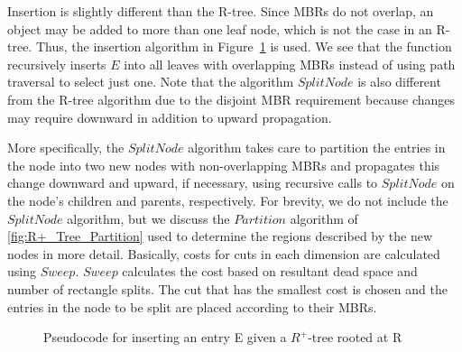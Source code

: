 Insertion is slightly different than the R-tree. Since MBRs do not overlap, an
object may be added to more than one leaf node, which is not the case in an R-tree. 
Thus, the insertion algorithm in Figure~\ref{fig:R+_Tree_Insert} is used. We see that
the function recursively inserts $E$ into all leaves with overlapping MBRs instead of 
using path traversal to select just one. Note that the algorithm $SplitNode$ is 
also different from the R-tree algorithm due to the disjoint MBR requirement because
changes may require downward in addition to upward propagation. 

More specifically, the $SplitNode$ algorithm takes care to partition the entries in 
the node into two new nodes with non-overlapping MBRs and propagates this change 
downward and upward, if necessary, using recursive calls to $SplitNode$ on the node's
children and parents, respectively. For brevity, we do not include the $SplitNode$ 
algorithm, but we discuss the $Partition$ algorithm of \ref{fig:R+_Tree_Partition} 
used to determine the regions described by the new nodes in more detail. Basically, 
costs for cuts in each dimension are calculated using $Sweep$. $Sweep$ calculates the
cost based on resultant dead space and number of rectangle splits. The cut that has 
the smallest cost is chosen and the entries in the node to be split are placed 
according to their MBRs. 

\begin{figure}
\begin{algorithmic}
					\State {}
				\EndIf
			\EndFor
		\Else
				\State {}
			\Else
			\EndIf
		\EndIf
	\EndFunction
\end{algorithmic}
\caption{Pseudocode for inserting an entry E given a $R^{+}$-tree rooted at R}
\label{fig:R+_Tree_Insert}
\end{figure}

